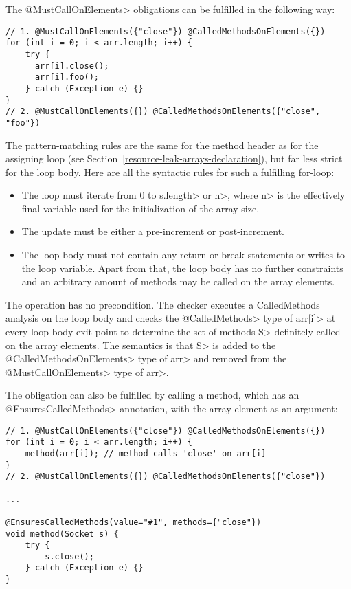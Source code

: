 
The \<@MustCallOnElements> obligations can be fulfilled in the following way:
\begin{verbatim}
// 1. @MustCallOnElements({"close"}) @CalledMethodsOnElements({})
for (int i = 0; i < arr.length; i++) {
    try {
      arr[i].close();
      arr[i].foo();
    } catch (Exception e) {}
}
// 2. @MustCallOnElements({}) @CalledMethodsOnElements({"close", "foo"})
\end{verbatim}

The pattern-matching rules are the same for the method header as for the assigning loop (see Section~\ref{resource-leak-arrays-declaration}), but far less strict for the loop body. Here are all the syntactic rules for such a fulfilling for-loop:
\begin{itemize}
  \item The loop must iterate from 0 to \<s.length> or \<n>, where \<n> is the effectively final variable used for the initialization of the array size.
  \item The update must be either a pre-increment or post-increment.
  \item The loop body must not contain any return or break statements or writes to the loop variable. Apart from that, the loop body has no further constraints and an arbitrary amount of methods may be called on the array elements.
\end{itemize}
The operation has no precondition. The checker executes a CalledMethods analysis on the loop body and checks the \<@CalledMethods> type of \<arr[i]> at every loop body exit point to determine the set of methods \<S> definitely called on the array elements. The semantics is that \<S> is added to the \<@CalledMethodsOnElements> type of \<arr> and removed from the \<@MustCallOnElements> type of \<arr>.

The obligation can also be fulfilled by calling a method, which has an \<@EnsuresCalledMethods> annotation, with the array element as an argument:
\begin{verbatim}
// 1. @MustCallOnElements({"close"}) @CalledMethodsOnElements({})
for (int i = 0; i < arr.length; i++) {
    method(arr[i]); // method calls 'close' on arr[i]
}
// 2. @MustCallOnElements({}) @CalledMethodsOnElements({"close"})

...

@EnsuresCalledMethods(value="#1", methods={"close"})
void method(Socket s) {
    try {
        s.close();
    } catch (Exception e) {}
}
\end{verbatim}

